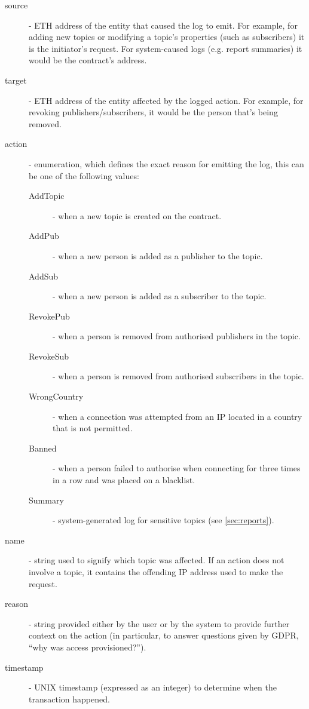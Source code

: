 \begin{description}
    \item[source] - ETH address of the entity that caused the log to emit. For example, for adding new topics or modifying a topic's properties (such as subscribers) it is the initiator's request. For system-caused logs (e.g. report summaries) it would be the contract's address.
    \item[target] - ETH address of the entity affected by the logged action. For example, for revoking publishers/subscribers, it would be the person that's being removed.
    \item[action] - enumeration, which defines the exact reason for emitting the log, this can be one of the following values:
    \begin{description}
        \item[AddTopic] - when a new topic is created on the contract.
        \item[AddPub] - when a new person is added as a publisher to the topic.
        \item[AddSub] - when a new person is added as a subscriber to the topic.
        \item[RevokePub] - when a person is removed from authorised publishers in the topic.
        \item[RevokeSub] - when a person is removed from authorised subscribers in the topic.
        \item[WrongCountry] - when a connection was attempted from an IP located in a country that is not permitted.
        \item[Banned] - when a person failed to authorise when connecting for three times in a row and was placed on a blacklist.
        \item[Summary] - system-generated log for sensitive topics (see \ref{sec:reports}).
    \end{description}
    \item[name] - string used to signify which topic was affected. If an action does not involve a topic, it contains the offending IP address used to make the request.
    \item[reason] - string provided either by the user or by the system to provide further context on the action (in particular, to answer questions given by GDPR, ``why was access provisioned?'').
    \item[timestamp] - UNIX timestamp (expressed as an integer) to determine when the transaction happened.
\end{description}
